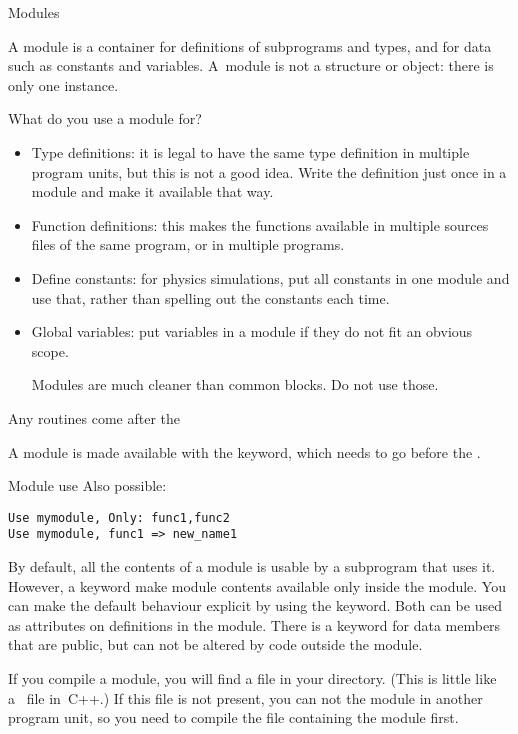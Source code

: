  {Modules}
\label{sec:modulef}

A module is a container for definitions of subprograms and types, and
for data such as constants and variables. A~module is not a 
structure or object: there is only one instance.

What do you use a module for?
\begin{itemize}
\item Type definitions: it is legal to have the same type definition
  in multiple program units, but this is not a good idea. 
  Write the definition just once in a module and make it available
  that way.
\item Function definitions: this makes the functions available in multiple
  sources files of the same program, or in multiple programs.
\item Define constants: for physics simulations, put all constants in
  one module and use that, rather than spelling out the constants each
  time.
\item Global variables: put variables in a module if they do not fit
  an obvious scope.
  \begin{f77note}
  Modules are much cleaner than common blocks. Do not use those.
  \end{f77note}
\end{itemize}
%

Any routines come after the 

A module is made available with the  keyword, which
needs to go before the .
%
\begin{block}{Module use}
  \label{sl:moduleuse}
  Also possible:
\begin{lstlisting}
Use mymodule, Only: func1,func2
Use mymodule, func1 => new_name1
\end{lstlisting}
\end{block}

By default, all the contents of a module is usable by a subprogram
that uses it. However, a keyword  make module
contents available only inside the module.
You can make the default behaviour explicit by using the
 keyword. Both  can be used as
attributes on definitions in the module.
There is a keyword  for data members that
are public, but can not be altered by code outside the module.

If you compile a module, you will find a  file in your
directory. (This is little like a~ file in~C++.)
If this file is not present, you can not  the module in another
program unit, so you need to compile the file containing the module
first.


